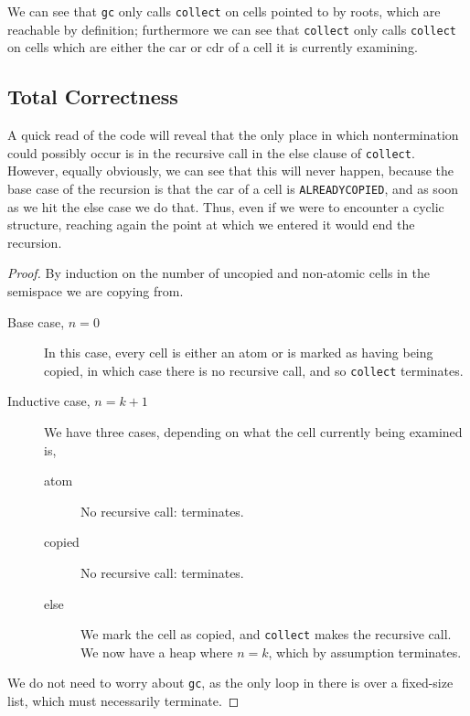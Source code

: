 \begin{lemma}
  \label{lem:c-example-unreach}
  We can see that \texttt{gc} only calls \texttt{collect} on
  cells pointed to by roots, which are reachable by definition;
  furthermore we can see that \texttt{collect} only calls
  \texttt{collect} on cells which are either the car or cdr of a cell
  it is currently examining.
\end{lemma}

\subsection{Total Correctness}
\label{sec:copying-example-total}

A quick read of the code will reveal that the only place in which
nontermination could possibly occur is in the recursive call in the
else clause of \texttt{collect}. However, equally obviously, we can
see that this will never happen, because the base case of the
recursion is that the car of a cell is \texttt{ALREADYCOPIED}, and as
soon as we hit the else case we do that. Thus, even if we were to
encounter a cyclic structure, reaching again the point at which we
entered it would end the recursion.

\begin{proof}
  By induction on the number of uncopied and non-atomic cells in the
  semispace we are copying from.

  \begin{description}
  \item[Base case, $n = 0$] In this case, every cell is either an atom
    or is marked as having being copied, in which case there is no
    recursive call, and so \texttt{collect} terminates.

  \item[Inductive case, $n = k + 1$] We have three cases, depending on
    what the cell currently being examined is,

    \begin{description}
    \item[atom] No recursive call: terminates.
    \item[copied] No recursive call: terminates.
    \item[else] We mark the cell as copied, and \texttt{collect} makes
      the recursive call. We now have a heap where $n = k$, which by
      assumption terminates.
    \end{description}
  \end{description}

  We do not need to worry about \texttt{gc}, as the only loop in there
  is over a fixed-size list, which must necessarily terminate.
\end{proof}


